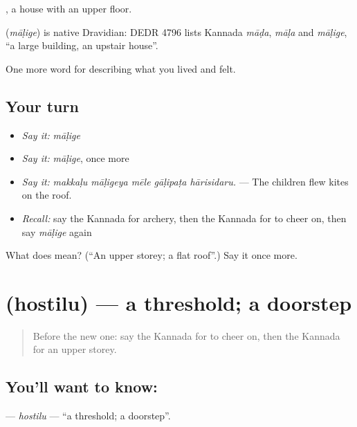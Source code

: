  , a house with an upper floor.

\begin{cousinweb}
\textbf{} (\emph{māḷige}) is native Dravidian: DEDR 4796 lists Kannada \emph{māḍa}, \emph{māḷa} and \emph{māḷige}, \textquotedblleft{}a large building, an upstair house\textquotedblright{}.
\end{cousinweb}

\begin{grammarlens}[title={What you've built}]
One more word for describing what you lived and felt.
\end{grammarlens}

\subsection*{Your turn}
\begin{itemize}
\raggedright
  \item \emph{Say it:} \emph{māḷige}
  \item \emph{Say it:} \emph{māḷige}, once more
  \item \emph{Say it:} \emph{makkaḷu māḷigeya mēle gāḷipaṭa hārisidaru.} — The children flew kites on the roof.
  \item \emph{Recall:} say the Kannada for archery, then the Kannada for to cheer on, then say \emph{māḷige} again
\end{itemize}

\begin{tcolorbox}[breakable,colback=teal!4,colframe=teal!35!black,title={Before you move on}]
What does  mean? (\textquotedblleft{}An upper storey; a flat roof\textquotedblright{}.) Say it once more.
\end{tcolorbox}
\section[\texorpdfstring{\kn{ಹೊಸ್ತಿಲು} (hostilu)}{ಹೊಸ್ತಿಲು (hostilu)}]{ (hostilu) — a threshold; a doorstep}

\label{lesson:KA-C542-hostilu}



\begin{quote}
Before the new one: say the Kannada for to cheer on, then the Kannada for an upper storey.
\end{quote}

\subsection*{You'll want to know: }
\textbf{} — \emph{hostilu} — \textquotedblleft{}a threshold; a doorstep\textquotedblright{}.

